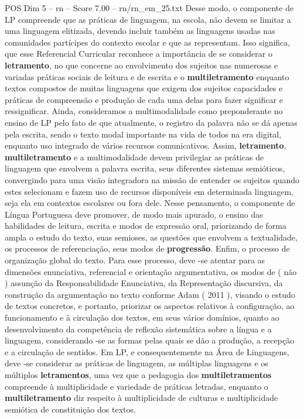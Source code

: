 \begin{textsample}{POS Dim 5 – rn – Score 7.00 – rn/rn\_em\_25.txt}
Desse modo, o componente de LP compreende que as práticas de linguagem, na escola, não devem se limitar a uma linguagem elitizada, devendo incluir também as linguagens usadas nas comunidades partícipes do contexto escolar e que as representam.
Isso significa, que esse Referencial Curricular reconhece a importância de se considerar o \textbf{letramento}, no que concerne ao envolvimento dos sujeitos nas numerosas e variadas práticas sociais de leitura e de escrita e o \textbf{multiletramento} enquanto textos compostos de muitas linguagens que exigem dos sujeitos capacidades e práticas de compreensão e produção de cada uma delas para fazer significar e ressignificar.
Ainda, consideramos a multimodalidade como preponderante no ensino de LP pelo fato de que atualmente, o registro da palavra não se dá apenas pela escrita, sendo o texto modal importante na vida de todos na era digital, enquanto uso integrado de vários recursos comunicativos.
Assim, \textbf{letramento}, \textbf{multiletramento} e a multimodalidade devem privilegiar as práticas de linguagem que envolvem a palavra escrita, seus diferentes sistemas semióticos, convergindo para uma visão integradora na missão de entender os sujeitos quando estes selecionam e fazem uso de recursos disponíveis em determinada linguagem, seja ela em contextos escolares ou fora dele.
Nesse pensamento, o componente de Língua Portuguesa deve promover, de modo mais apurado, o ensino das habilidades de leitura, escrita e modos de expressão oral, priorizando de forma ampla o estudo do texto, suas semioses, as questões que envolvem a textualidade, os processos de referenciação, seus modos de \textbf{progressão}.
Enfim, o processo de organização global do texto.
Para esse processo, deve -se atentar para as dimensões enunciativa, referencial e orientação argumentativa, os modos de ( não ) assunção da Responsabilidade Enunciativa, da Representação discursiva, da construção da argumentação no texto conforme Adam ( 2011 ), visando o estudo de textos concretos, e portanto, priorizar os aspectos relativos à configuração, ao funcionamento e à circulação dos textos, em seus vários domínios, quanto ao desenvolvimento da competência de reflexão sistemática sobre a língua e a linguagem, considerando -se as formas pelas quais se dão a produção, a recepção e a circulação de sentidos.
Em LP, e consequentemente na Área de Linguagens, deve -se considerar as práticas de linguagem, as múltiplas linguagens e os múltiplos \textbf{letramentos}, uma vez que a pedagogia dos \textbf{multiletramentos} compreende à multiplicidade e variedade de práticas letradas, enquanto o \textbf{multiletramento} diz respeito à multiplicidade de culturas e multiplicidade semiótica de constituição dos textos.

\end{textsample}
